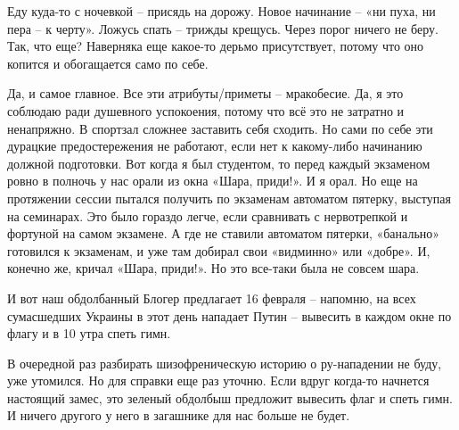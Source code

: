 Еду куда-то с ночевкой – присядь на дорожу. Новое начинание – «ни пуха, ни пера
– к черту». Ложусь спать – трижды крещусь. Через порог ничего не беру. Так, что
еще? Наверняка еще какое-то дерьмо присутствует, потому что оно копится и
обогащается само по себе.

Да, и самое главное. Все эти атрибуты/приметы – мракобесие. Да, я это соблюдаю
ради душевного успокоения, потому что всё это не затратно и ненапряжно. В
спортзал сложнее заставить себя сходить. Но сами по себе эти дурацкие
предостережения не работают, если нет к какому-либо начинанию должной
подготовки. Вот когда я был студентом, то перед каждый экзаменом ровно в
полночь у нас орали из окна «Шара, приди!». И я орал. Но еще на протяжении
сессии пытался получить по экзаменам автоматом пятерку, выступая на семинарах.
Это было гораздо легче, если сравнивать с нервотрепкой и фортуной на самом
экзамене. А где не ставили автоматом пятерки, «банально» готовился к экзаменам,
и уже там добирал свои «видминно» или «добре». И, конечно же, кричал «Шара,
приди!». Но это все-таки была не совсем шара.

И вот наш обдолбанный Блогер предлагает 16 февраля – напомню, на всех
сумасшедших Украины в этот день нападает Путин – вывесить в каждом окне по
флагу и в 10 утра спеть гимн.

В очередной раз разбирать шизофреническую историю о ру-нападении не буду, уже
утомился. Но для справки еще раз уточню. Если вдруг когда-то начнется настоящий
замес, это зеленый обдолбыш предложит вывесить флаг и спеть гимн. И ничего
другого у него в загашнике для нас больше не будет.

